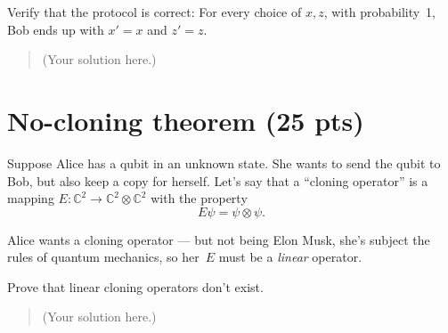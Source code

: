 \documentclass[a4paper,10pt,reqno,nonamelimits]{article}
\newcommand{\CC}{\mathbb C}
\begin{document}
Verify that the protocol is correct: For every choice of $x,z$, with probability~1, Bob ends up with $x'=x$ and
$z'=z$.

\begin{quotation}\color{blue}
  (Your solution here.)
\end{quotation}

\section{No-cloning theorem (25 pts)}
Suppose Alice has a qubit in an unknown state.  She wants to send the qubit to Bob, but also keep a copy for
herself.  Let's say that a ``cloning operator'' is a mapping $E\colon\CC^2\to\CC^2\otimes\CC^2$ with the property
\begin{equation}\label{eq:cloneing-operator}
  E\psi = \psi\otimes\psi.
\end{equation}

Alice wants a cloning operator --- but not being Elon Musk, she's subject the rules of quantum mechanics, so
her~$E$ must be a \emph{linear} operator.

Prove that linear cloning operators don't exist.

\begin{quotation}\color{blue}
  (Your solution here.)
\end{quotation}
\end{document}

